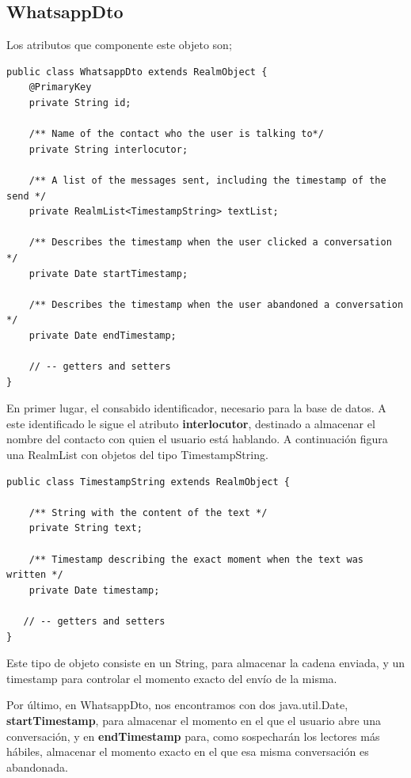 \documentclass[12pt,a4paper,oneside]{book} %
\begin{document}
\subsection{WhatsappDto}
Los atributos que componente este objeto son; 
\begin{verbatim}
public class WhatsappDto extends RealmObject {
	@PrimaryKey
    private String id;

    /** Name of the contact who the user is talking to*/
    private String interlocutor;

    /** A list of the messages sent, including the timestamp of the send */
    private RealmList<TimestampString> textList;

    /** Describes the timestamp when the user clicked a conversation */
    private Date startTimestamp;

    /** Describes the timestamp when the user abandoned a conversation */
    private Date endTimestamp;
    
    // -- getters and setters
}
\end{verbatim}
En primer lugar, el consabido identificador, necesario para la base de datos. 
\newline \newline 
A este identificado le sigue el atributo \textbf{interlocutor}, destinado a almacenar el nombre del contacto con quien el usuario está hablando. 
\newline \newline 
A continuación figura una RealmList con objetos del tipo TimestampString. 
\begin{verbatim}
public class TimestampString extends RealmObject {

    /** String with the content of the text */
    private String text;

    /** Timestamp describing the exact moment when the text was written */
    private Date timestamp;
   
   // -- getters and setters 
}
\end{verbatim}
Este tipo de objeto consiste en un String, para almacenar la cadena enviada, y un timestamp para controlar el momento exacto del envío de la misma. 

Por último, en WhatsappDto, nos encontramos con dos java.util.Date, \textbf{startTimestamp}, para almacenar el momento en el que el usuario abre una conversación, y en \textbf{endTimestamp} para, como sospecharán los lectores más hábiles, almacenar el momento exacto en el que esa misma conversación es abandonada. 
\end{document}
